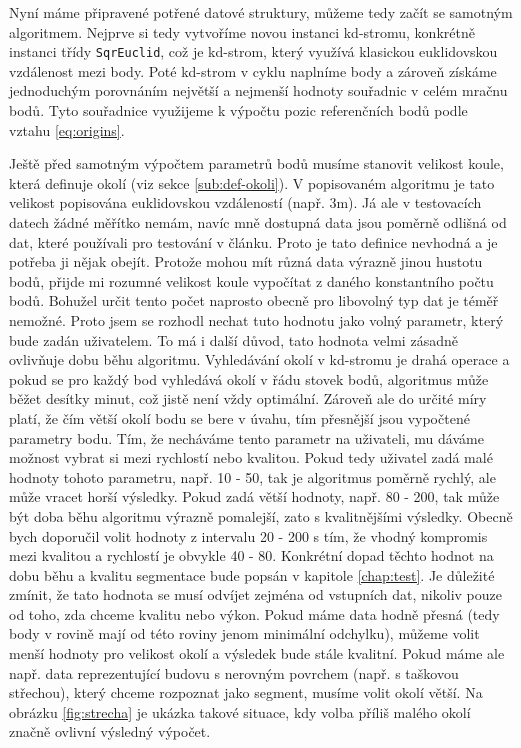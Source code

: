 \documentclass[11pt,twoside,a4paper]{book}
\begin{document}
Nyní máme připravené potřené datové struktury, můžeme tedy začít se samotným algoritmem. Nejprve si tedy vytvoříme novou instanci kd-stromu, konkrétně instanci třídy \verb|SqrEuclid|, což je kd-strom, který využívá klasickou euklidovskou vzdálenost mezi body. Poté kd-strom  v cyklu naplníme body a zároveň získáme jednoduchým porovnáním  největší a nejmenší hodnoty souřadnic v celém mračnu bodů. Tyto souřadnice využijeme k výpočtu pozic referenčních bodů podle vztahu \ref{eq:origins}.

Ještě před samotným výpočtem parametrů bodů musíme stanovit velikost koule, která definuje okolí (viz sekce \ref{sub:def-okoli}). V popisovaném algoritmu je tato velikost popisována euklidovskou vzdáleností (např. 3m). Já ale v testovacích datech žádné měřítko nemám, navíc mně dostupná data jsou poměrně odlišná od dat, které používali pro testování v článku. Proto je tato definice nevhodná a je potřeba ji nějak obejít. Protože mohou mít různá data výrazně jinou hustotu bodů, přijde mi rozumné velikost koule vypočítat z daného konstantního počtu bodů. Bohužel určit tento počet naprosto obecně pro libovolný typ dat je téměř nemožné. Proto jsem se rozhodl nechat tuto hodnotu jako volný parametr, který bude zadán uživatelem. To má i další důvod, tato hodnota velmi zásadně ovlivňuje dobu běhu algoritmu. Vyhledávání okolí v kd-stromu je drahá operace a pokud se pro každý bod vyhledává okolí v řádu stovek bodů, algoritmus může běžet desítky minut, což jistě není vždy optimální. Zároveň ale do určité míry platí, že čím větší okolí bodu se bere v úvahu, tím přesnější jsou vypočtené parametry bodu. Tím, že necháváme tento parametr na uživateli, mu dáváme možnost vybrat si mezi rychlostí nebo kvalitou. Pokud tedy uživatel zadá malé hodnoty tohoto parametru, např. 10 - 50, tak je algoritmus poměrně rychlý, ale může vracet horší výsledky. Pokud zadá větší hodnoty, např. 80 - 200, tak může být doba běhu algoritmu výrazně pomalejší, zato s kvalitnějšími výsledky. Obecně bych doporučil volit hodnoty z intervalu 20 - 200 s tím, že vhodný kompromis mezi kvalitou a rychlostí je obvykle 40 - 80. Konkrétní dopad těchto hodnot na dobu běhu a kvalitu segmentace bude popsán v kapitole \ref{chap:test}. Je důležité zmínit, že tato hodnota se musí odvíjet zejména od vstupních dat, nikoliv pouze od toho, zda chceme kvalitu nebo výkon. Pokud máme data hodně přesná (tedy body v rovině mají od této roviny jenom minimální odchylku), můžeme volit menší hodnoty pro velikost okolí a výsledek bude stále kvalitní. Pokud máme ale např. data reprezentující budovu s nerovným povrchem (např. s taškovou střechou), který chceme rozpoznat jako segment, musíme volit okolí větší. Na obrázku \ref{fig:strecha} je ukázka takové situace, kdy volba příliš malého okolí značně ovlivní výsledný výpočet.
\end{document}
